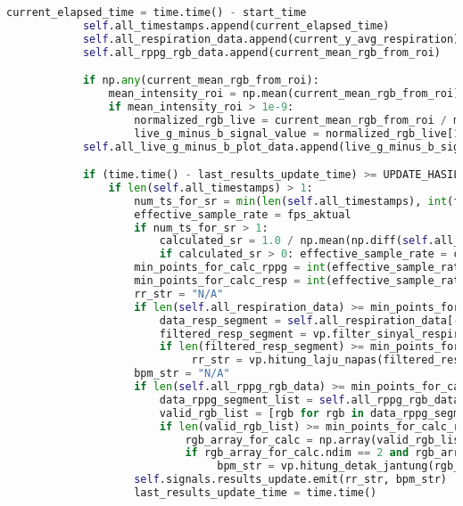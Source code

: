 \documentclass[11pt,a4paper]{article}
\begin{document}
\begin{lstlisting}[language=Python, caption=Kelas RealTimeSignalWorker,label={labelkode}]
            current_elapsed_time = time.time() - start_time
            self.all_timestamps.append(current_elapsed_time)
            self.all_respiration_data.append(current_y_avg_respiration)
            self.all_rppg_rgb_data.append(current_mean_rgb_from_roi) 

            if np.any(current_mean_rgb_from_roi): 
                mean_intensity_roi = np.mean(current_mean_rgb_from_roi)
                if mean_intensity_roi > 1e-9: 
                    normalized_rgb_live = current_mean_rgb_from_roi / mean_intensity_roi
                    live_g_minus_b_signal_value = normalized_rgb_live[1] - normalized_rgb_live[2] 
            self.all_live_g_minus_b_plot_data.append(live_g_minus_b_signal_value)

            if (time.time() - last_results_update_time) >= UPDATE_HASIL_SETIAP:
                if len(self.all_timestamps) > 1:
                    num_ts_for_sr = min(len(self.all_timestamps), int(fps_aktual * 5)) 
                    effective_sample_rate = fps_aktual 
                    if num_ts_for_sr > 1:
                        calculated_sr = 1.0 / np.mean(np.diff(self.all_timestamps[-num_ts_for_sr:]))
                        if calculated_sr > 0: effective_sample_rate = calculated_sr
                    min_points_for_calc_rppg = int(effective_sample_rate * DURASI_KALKULASI_RR_BPM)
                    min_points_for_calc_resp = int(effective_sample_rate * DURASI_KALKULASI_RESP)
                    rr_str = "N/A"
                    if len(self.all_respiration_data) >= min_points_for_calc_resp:
                        data_resp_segment = self.all_respiration_data[-min_points_for_calc_resp:]
                        filtered_resp_segment = vp.filter_sinyal_respirasi(data_resp_segment, effective_sample_rate)
                        if len(filtered_resp_segment) >= min_points_for_calc_resp * 0.8 : 
                             rr_str = vp.hitung_laju_napas(filtered_resp_segment, effective_sample_rate)
                    bpm_str = "N/A"
                    if len(self.all_rppg_rgb_data) >= min_points_for_calc_rppg:
                        data_rppg_segment_list = self.all_rppg_rgb_data[-min_points_for_calc_rppg:]
                        valid_rgb_list = [rgb for rgb in data_rppg_segment_list if isinstance(rgb, np.ndarray) and rgb.shape == (3,)]
                        if len(valid_rgb_list) >= min_points_for_calc_rppg * 0.8: 
                            rgb_array_for_calc = np.array(valid_rgb_list).T 
                            if rgb_array_for_calc.ndim == 2 and rgb_array_for_calc.shape[0] == 3:
                                 bpm_str = vp.hitung_detak_jantung(rgb_array_for_calc, effective_sample_rate)
                    self.signals.results_update.emit(rr_str, bpm_str)
                    last_results_update_time = time.time()


\end{lstlisting}
\end{document}
